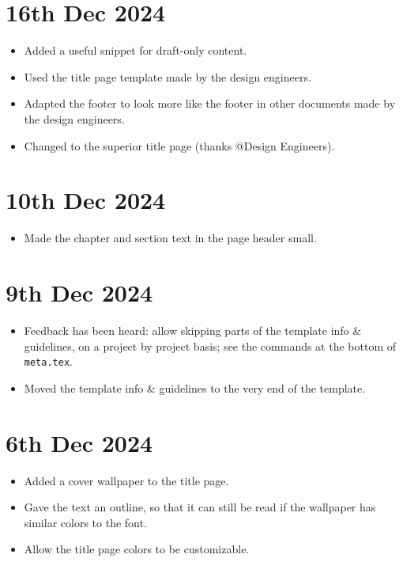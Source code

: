 
\section*{16th Dec 2024} \label{sec:changelog:2024/12/16}
\begin{itemize}
    \item Added a useful snippet for draft-only content.
    \item Used the title page template made by the design engineers.
    \item Adapted the footer to look more like the footer in other documents made by the design engineers.
    \item Changed to the superior title page (thanks @Design Engineers).
\end{itemize}

\section*{10th Dec 2024} \label{sec:changelog:2024/12/10}
\begin{itemize}
    \item Made the chapter and section text in the page header small.
\end{itemize}

\section*{9th Dec 2024} \label{sec:changelog:2024/12/09}
\begin{itemize}
    \item Feedback has been heard: allow skipping parts of the template info \& guidelines, on a project by project basis; see the commands at the bottom of \verb|meta.tex|.
    \item Moved the template info \& guidelines to the very end of the template.
\end{itemize}

\section*{6th Dec 2024} \label{sec:changelog:2024/12/06}
\begin{itemize}
    \item Added a cover wallpaper to the title page.
    \item Gave the text an outline, so that it can still be read if the wallpaper has similar colors to the font.
    \item Allow the title page colors to be customizable.
\end{itemize}

